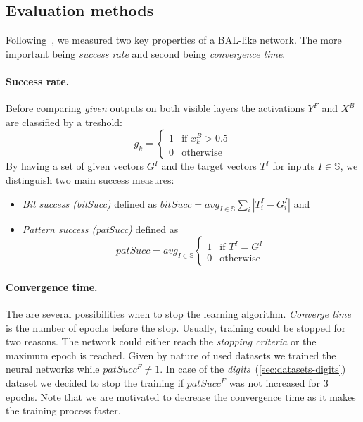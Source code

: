 
\subsection{Evaluation methods} 
\label{sec:sim-evaluation} 

Following~\citet{farkas2013bal}, we measured two key properties of a BAL-like network. The more important being \emph{success rate} and second being \emph{convergence time}. 

\paragraph{Success rate.}  
Before comparing \emph{given} outputs on both visible layers the activations $Y^F$ and $X^B$ are classified by a treshold: 
\begin{equation} 
  g_k =
  \left\{
	  \begin{array}{ll}
		  1 & \mbox{if } x_k^B > 0.5 \\
		  0 & \mbox{otherwise}
	  \end{array}
  \right.  
\end{equation} 
By having a set of given vectors $G^I$ and the target vectors $T^I$ for inputs $I \in \mathbb{S}$, we distinguish two main success measures: 

\begin{itemize}
  \item \emph{Bit success (bitSucc)} defined as $bitSucc = avg_{I \in \mathbb{S}} \sum_i |T_i^I - G^I_i|$ and 
  \item \emph{Pattern success (patSucc)} defined as 
    \begin{equation}
      patSucc = avg_{I \in \mathbb{S}} \left\{
	      \begin{array}{ll}
		      1 & \mbox{if } T^I = G^I \\
		      0 & \mbox{otherwise}
	      \end{array}
      \right.
    \end{equation} 
\end{itemize} 

\paragraph{Convergence time.} The are several possibilities when to stop the learning algorithm. \emph{Converge time} is the number of epochs before the stop. Usually, training could be stopped for two reasons. The network could either reach the \emph{stopping criteria} or the maximum epoch is reached. Given by nature of used datasets we trained the neural networks while $patSucc^F \neq 1$. In case of the \emph{digits}~(\ref{sec:datasets-digits}) dataset we decided to stop the training if $patSucc^F$ was not increased for 3 epochs. Note that we are motivated to decrease the convergence time as it makes the training process faster.  
